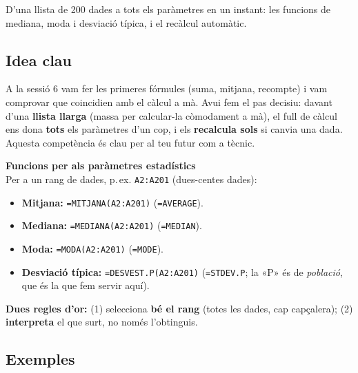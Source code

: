 %
{D'una llista de 200 dades a tots els paràmetres en un instant: les funcions de mediana, moda i desviació típica, i el recàlcul automàtic.}

\subsection{Idea clau}

A la sessió 6 vam fer les primeres fórmules (suma, mitjana, recompte) i vam comprovar
que coincidien amb el càlcul a mà. Avui fem el pas decisiu: davant d'una \textbf{llista
llarga} (massa per calcular-la còmodament a mà), el full de càlcul ens dona
\textbf{tots} els paràmetres d'un cop, i els \textbf{recalcula sols} si canvia una
dada. Aquesta competència és clau per al teu futur com a tècnic.

\begin{idea}
\textbf{Funcions per als paràmetres estadístics}\\
Per a un rang de dades, p.\,ex. \texttt{A2:A201} (dues-centes dades):
\begin{itemize}[leftmargin=1.4em, itemsep=2pt]
  \item \textbf{Mitjana:} \texttt{=MITJANA(A2:A201)} \quad (\texttt{=AVERAGE}).
  \item \textbf{Mediana:} \texttt{=MEDIANA(A2:A201)} \quad (\texttt{=MEDIAN}).
  \item \textbf{Moda:} \texttt{=MODA(A2:A201)} \quad (\texttt{=MODE}).
  \item \textbf{Desviació típica:} \texttt{=DESVEST.P(A2:A201)} \quad (\texttt{=STDEV.P};
        la «P» és de \emph{població}, que és la que fem servir aquí).
\end{itemize}
\textbf{Dues regles d'or:} (1) selecciona \textbf{bé el rang} (totes les dades, cap
capçalera); (2) \textbf{interpreta} el que surt, no només l'obtinguis.
\end{idea}

\subsection{Exemples}

